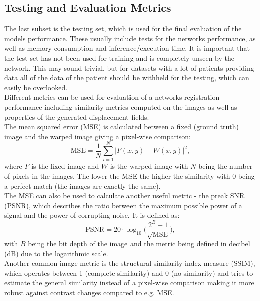 \documentclass[english,version-2022-01]{uzl-thesis} %
\begin{document}
\subsection{Testing and Evaluation Metrics} \label{SubSec:TestingEvalutionMetrics}
The last subset is the testing set, which is used for the final evaluation of the models performance. These usually include tests for the networks performance, as well as memory consumption and inference/execution time. It is important that the test set has not been used for training and is completely unseen by the network. This may sound trivial, but for datasets with a lot of patients providing data all of the data of the patient should be withheld for the testing, which can easily be overlooked.\\
Different metrics can be used for evaluation of a networks registration performance including similarity metrics computed on the images as well as properties of the generated displacement fields. \\
The mean squared error (MSE) is calculated between a fixed (ground truth) image and the warped image giving a pixel-wise comparison:
\begin{equation}
	\text{MSE} = \frac{1}{N} \sum_{i=1}^{N} |F(x,y) - W(x,y)|^2,
\end{equation}
where $F$ is the fixed image and $W$ is the warped image with $N$ being the number of pixels in the images. The lower the MSE the higher the similarity with 0 being a perfect match (the images are exactly the same).\\
The MSE can also be used to calculate another useful metric - the preak SNR (PSNR), which describes the ratio between the maximum possible power of a signal and the power of corrupting noise. It is defined as:
\begin{equation}
	\text{PSNR} = 20 \cdot \log_{10} \bigg(\frac{2^B - 1}{\sqrt{\text{MSE}}} \bigg),
\end{equation}
with $B$ being the bit depth of the image and the metric being defined in decibel (dB) due to the logarithmic scale.\\
Another common image metric is the structural similarity index measure (SSIM), which operates between 1 (complete similarity) and 0 (no similarity) and tries to estimate the general similarity instead of a pixel-wise comparison making it more robust against contrast changes compared to e.g. MSE.
\end{document}
